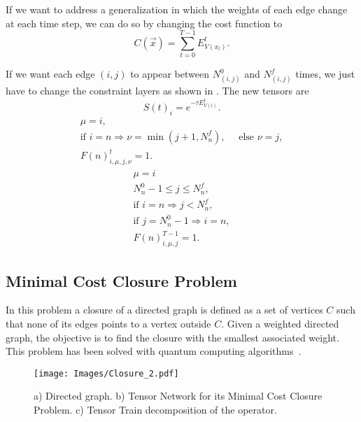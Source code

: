 If we want to address a generalization in which the weights of each edge change at each time step, we can do so by changing the cost function to
\begin{equation}
    C(\vec{x})=\sum_{t=0}^{T-1}E^t_{V({x_t})} .
\end{equation}

If we want each edge $(i,j)$ to appear between $N^0_{(i,j)}$ and $N^f_{(i,j)}$ times, we just have to change the constraint layers as shown in \cite{TSP_TN}. The new tensors are
\begin{equation}
        S(t)_i = e^{-\tau E^t_{V(i)}}.
\end{equation}
\begin{equation}
     \begin{gathered}
        \mu=i,\\
        \text{if } i=n\Rightarrow \nu=\min(j+1,N^f_n),\quad \text{ else } \nu=j,\\
        F(n)^t_{i,\mu,j,\nu} = 1.
     \end{gathered}
\end{equation}
\begin{equation}
     \begin{gathered}
        \mu=i\\
        N^0_n-1\leq j\leq N^f_n,\\
        \text{if } i=n\Rightarrow j<N^f_n,\\
        \text{if } j=N^0_n-1\Rightarrow i=n,\\
        F(n)^{T-1}_{i,\mu,j} = 1.
     \end{gathered}
\end{equation}



\subsection{Minimal Cost Closure Problem}
In this problem a closure of a directed graph is defined as a set of vertices $C$ such that none of its edges points to a vertex outside $C$. Given a weighted directed graph, the objective is to find the closure with the smallest associated weight. This problem has been solved with quantum computing algorithms~\cite{Postman_Quantum}.

\begin{figure}[h]
    \centering
    \texttt{[image: Images/Closure\_2.pdf]}
    \caption{a) Directed graph. b) Tensor Network for its Minimal Cost Closure Problem. c) Tensor Train decomposition of the operator.}
    \label{fig: Closure 2}
\end{figure}

